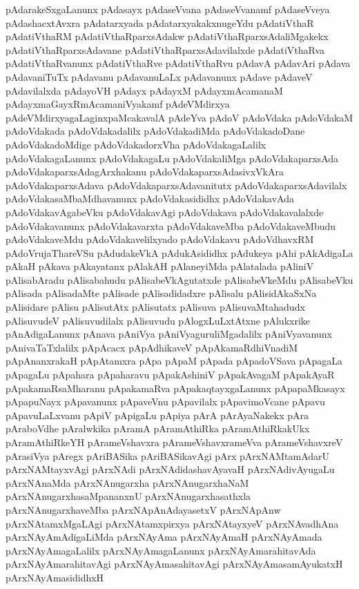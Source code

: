 {pAdarakeSxgaLanunx
pAdasayx
pAdaseVvana
pAdaseVvanamf
pAdaseVveya
pAdashacxtAvxra
pAdatarxyada
pAdatarxyakakxnugeYdu
pAdatiVthaR
pAdatiVthaRM
pAdatiVthaRparxsAdakw
pAdatiVthaRparxsAdaliMgakekx
pAdatiVthaRparxsAdavane
pAdatiVthaRparxsAdavilalxde
pAdatiVthaRva
pAdatiVthaRvanunx
pAdatiVthaRve
pAdatiVthaRvu
pAdavA
pAdavAri
pAdava
pAdavaniTuTx
pAdavanu
pAdavanuLaLx
pAdavanunx
pAdave
pAdaveV
pAdavilalxda
pAdayoVH
pAdayx
pAdayxM
pAdayxmAcamanaM
pAdayxmaGayxRmAcamaniVyakamf
pAdeVMdirxya
pAdeVMdirxyagaLaginxpaMcakavalA
pAdeYva
pAdoV
pAdoVdaka
pAdoVdakaM
pAdoVdakada
pAdoVdakadalilx
pAdoVdakadiMda
pAdoVdakadoDane
pAdoVdakadoMdige
pAdoVdakadorxVha
pAdoVdakagaLalilx
pAdoVdakagaLanunx
pAdoVdakagaLu
pAdoVdakaliMga
pAdoVdakaparxsAda
pAdoVdakaparxsAdagArxhakanu
pAdoVdakaparxsAdasivxVkAra
pAdoVdakaparxsAdava
pAdoVdakaparxsAdavanitutx
pAdoVdakaparxsAdavilalx
pAdoVdakasaMbaMdhavanunx
pAdoVdakasididhx
pAdoVdakavAda
pAdoVdakavAgabeVku
pAdoVdakavAgi
pAdoVdakava
pAdoVdakavalalxde
pAdoVdakavanunx
pAdoVdakavarxta
pAdoVdakaveMba
pAdoVdakaveMbudu
pAdoVdakaveMdu
pAdoVdakavelilxyado
pAdoVdakavu
pAdoVdhavxRM
pAdoVrujaThareVSu
pAdudakeVkA
pAdukAsididhx
pAdukeya
pAhi
pAkAdigaLa
pAkaH
pAkava
pAkayatanx
pAlakAH
pAlaneyiMda
pAlatalada
pAliniV
pAlisabAradu
pAlisabahudu
pAlisabeVkAgutatxde
pAlisabeVkeMdu
pAlisabeVku
pAlisada
pAlisadaMte
pAlisade
pAlisadidadxre
pAlisalu
pAlisidAkaSxNa
pAlisidare
pAlisu
pAlisutAtx
pAlisutatx
pAlisuva
pAlisuvaMtahadudx
pAlisuvudeV
pAlisuvudilalx
pAlisuvudu
pAlogxLuLxtAtxne
pAlukxrike
pAnAdigaLanunx
pAnava
pAniVya
pAniVyaguruliMgadalilx
pAniVyavanunx
pAnivaTaTxlalilx
pApAcacx
pApAdhikaveV
pApAkamaRdhiVnadiM
pApAnanxrakaH
pApAtamxra
pApa
pApaM
pApada
pApadoVSava
pApagaLa
pApagaLu
pApahara
pApaharavu
pApakAshiniV
pApakAvagaM
pApakAyaR
pApakamaRsaMharanu
pApakamaRva
pApakaqtayxgaLanunx
pApapaMkasayx
pApapuNayx
pApavanunx
pApaveVnu
pApavilalx
pApavimoVcane
pApavu
pApavuLaLxvanu
pApiV
pApigaLu
pApiya
pArA
pArAyaNakekx
pAra
pAraboVdhe
pAralwkika
pAramA
pAramAthiRka
pAramAthiRkakUkx
pAramAthiRkeYH
pArameVshavxra
pArameVshavxrameVva
pArameVshavxreV
pArasiVya
pAregx
pAriBASika
pAriBASikavAgi
pArx
pArxNAMtamAdarU
pArxNAMtayxvAgi
pArxNAdi
pArxNAdidashavAyavaH
pArxNAdivAyugaLu
pArxNAnaMda
pArxNAnugarxha
pArxNAnugarxhaNaM
pArxNAnugarxhasaMpananxnU
pArxNAnugarxhasathxla
pArxNAnugarxhaveMba
pArxNApAnAdayasetxV
pArxNApAnw
pArxNAtamxMgaLAgi
pArxNAtamxpirxya
pArxNAtayxyeV
pArxNAvadhAna
pArxNAyAmAdigaLiMda
pArxNAyAma
pArxNAyAmaH
pArxNAyAmada
pArxNAyAmagaLalilx
pArxNAyAmagaLanunx
pArxNAyAmarahitavAda
pArxNAyAmarahitavAgi
pArxNAyAmasahitavAgi
pArxNAyAmasamAyukatxH
pArxNAyAmasididhxH
}

